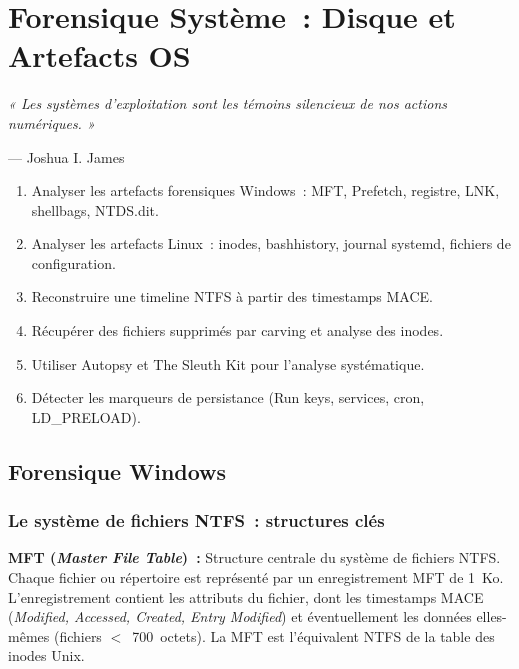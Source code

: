 \chapter{Forensique Système~: Disque et Artefacts OS}
\label{chap:forensics-systeme}

\epigraph{\itshape « Les systèmes d'exploitation sont les témoins
  silencieux de nos actions numériques. »}
         {--- Joshua I. James}

\begin{boxobjectifs}
\begin{enumerate}
  \item Analyser les artefacts forensiques Windows~: MFT, Prefetch, registre,
        LNK, shellbags, NTDS.dit.
  \item Analyser les artefacts Linux~: inodes, bashhistory, journal systemd,
        fichiers de configuration.
  \item Reconstruire une timeline NTFS à partir des timestamps MACE.
  \item Récupérer des fichiers supprimés par carving et analyse des inodes.
  \item Utiliser Autopsy et The Sleuth Kit pour l'analyse systématique.
  \item Détecter les marqueurs de persistance (Run keys, services, cron, LD\_PRELOAD).
\end{enumerate}
\end{boxobjectifs}

\section{Forensique Windows}
\label{sec:forensics-windows}

\subsection{Le système de fichiers NTFS~: structures clés}

\begin{boxdef}
\textbf{MFT (\textit{Master File Table})~:} Structure centrale du système
de fichiers NTFS. Chaque fichier ou répertoire est représenté par un
enregistrement MFT de 1~Ko. L'enregistrement contient les attributs du
fichier, dont les timestamps MACE (\textit{Modified, Accessed, Created,
Entry Modified}) et éventuellement les données elles-mêmes (fichiers $<$~700~octets).
La MFT est l'équivalent NTFS de la table des inodes Unix.
\end{boxdef}

